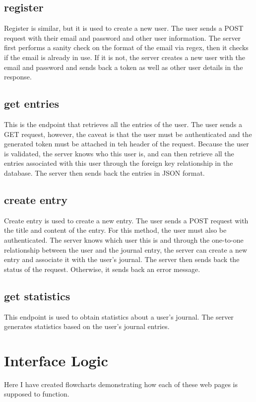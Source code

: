 \subsection{register}
Register is similar, but it is used to create a new user. The user sends a POST request with their email and password and other user information. The server first performs a sanity check on the format of the email via regex, then it checks if the email is already in use. If it is not, the server creates a new user with the email and password and sends back a token as well as other user details in the response.


\subsection{get entries}
This is the endpoint that retrieves all the entries of the user. The user sends a GET request, however, the caveat is that the user must be authenticated and the generated token must be attached in teh header of the request. Because the user is validated, the server knows who this user is, and can then retrieve all the entries associated with this user through the foreign key relationship in the database. The server then sends back the entries in JSON format.

\subsection{create entry}
Create entry is used to create a new entry. The user sends a POST request with the title and content of the entry. For this method, the user must also be authenticated. The server knows which user this is and through the one-to-one relationship between the user and the journal entry, the server can create a new entry and associate it with the user's journal. The server then sends back the status of the request. Otherwise, it sends back an error message.

\subsection{get statistics}
This endpoint is used to obtain statistics about a user's journal. The server generates statistics based on the user's journal entries. 

\section{Interface Logic}
Here I have created flowcharts demonstrating how each of these web pages is supposed to function.

